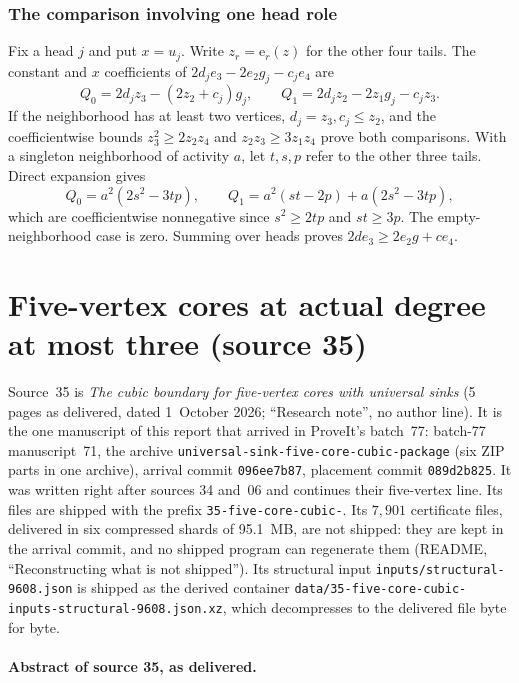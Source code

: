 \documentclass[11pt]{article}
\numberwithin{equation}{section}
\theoremstyle{definition}\newtheorem{definition}[theorem]{Definition}\newtheorem{remark}[theorem]{Remark}
\newcommand{\ee}{\mathrm e}                %
\begin{document}
\subsubsection{The comparison involving one head role}
Fix a head $j$ and put $x=u_j$. Write $z_r=\ee_r(z)$ for the other four tails. The constant and $x$ coefficients of
$2d_je_3-2e_2g_j-c_je_4$ are
\[
 Q_0=2d_jz_3-(2z_2+c_j)g_j,\qquad
 Q_1=2d_jz_2-2z_1g_j-c_jz_3.
\]
If the neighborhood has at least two vertices, $d_j=z_3,c_j\le z_2$, and the coefficientwise bounds $z_3^2\ge2z_2z_4$ and $z_2z_3\ge3z_1z_4$ prove both comparisons. With a singleton neighborhood of activity $a$, let $t,s,p$ refer to the other three tails. Direct expansion gives
\[
 Q_0=a^2(2s^2-3tp),\qquad
 Q_1=a^2(st-2p)+a(2s^2-3tp),
\]
which are coefficientwise nonnegative since $s^2\ge2tp$ and $st\ge3p$. The empty-neighborhood case is zero. Summing over heads proves $2de_3\ge2e_2g+ce_4$.


\section{Five-vertex cores at actual degree at most three (source 35)}\label{pgr:s:fq:sec}

Source~35 is \emph{The cubic boundary for five-vertex cores with universal
sinks} (5 pages as delivered, dated 1~October 2026; ``Research note'', no
author line). It is the one manuscript of this report that arrived in
ProveIt's batch~77: batch-77 manuscript~71, the archive
\nolinkurl{universal-sink-five-core-cubic-package} (six ZIP parts in one
archive), arrival commit \texttt{096ee7b87}, placement commit
\texttt{089d2b825}. It was written right after sources 34 and~06 and
continues their five-vertex line. Its files are shipped with the prefix
\texttt{35-five-core-cubic-}. Its $7{,}901$ certificate files, delivered in
six compressed shards of 95.1~MB, are not shipped: they are kept in the
arrival commit, and no shipped program can regenerate them (README,
``Reconstructing what is not shipped''). Its structural input
\nolinkurl{inputs/structural-9608.json} is shipped as the derived container
\nolinkurl{data/35-five-core-cubic-inputs-structural-9608.json.xz}, which
decompresses to the delivered file byte for byte.

\paragraph{Abstract of source 35, as delivered.}
\end{document}
